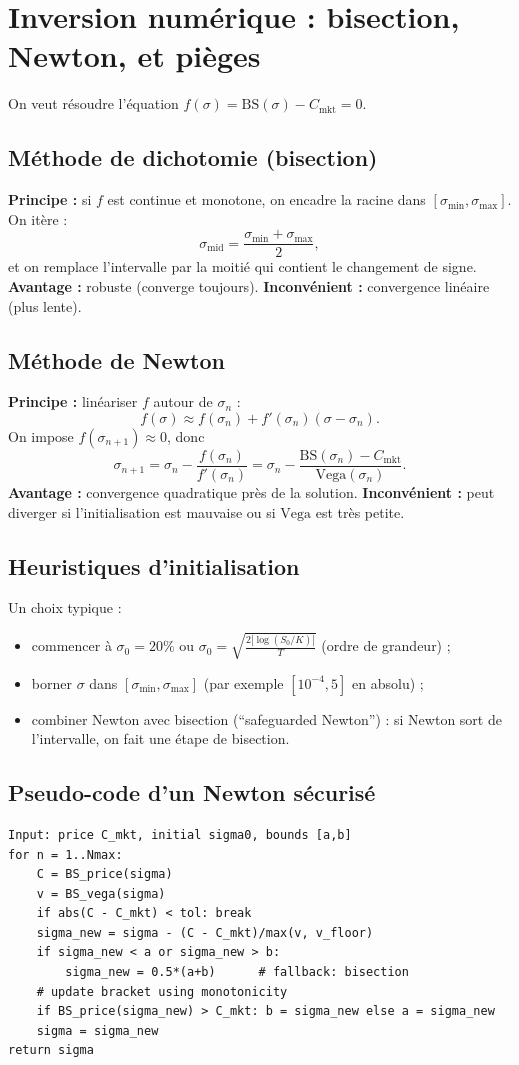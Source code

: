 \documentclass[11pt,a4paper]{report}
\newcommand{\1}{\mathbbm{1}}
\newcommand{\abs}[1]{\left|#1\right|}
\newcommand{\BS}{\mathrm{BS}}
\newcommand{\vega}{\mathrm{Vega}}
\theoremstyle{definition}
\theoremstyle{plain}
\theoremstyle{remark}
\begin{document}
\section{Inversion numérique : bisection, Newton, et pièges}
On veut résoudre l'équation $f(\sigma)=\BS(\sigma)-C_{\mathrm{mkt}}=0$.

\subsection{Méthode de dichotomie (bisection)}
\textbf{Principe :} si $f$ est continue et monotone, on encadre la racine dans $[\sigma_{\min},\sigma_{\max}]$.
On itère :
\[
\sigma_{\mathrm{mid}}=\frac{\sigma_{\min}+\sigma_{\max}}{2},
\]
et on remplace l'intervalle par la moitié qui contient le changement de signe.
\textbf{Avantage :} robuste (converge toujours).
\textbf{Inconvénient :} convergence linéaire (plus lente).

\subsection{Méthode de Newton}
\textbf{Principe :} linéariser $f$ autour de $\sigma_n$ :
\[
f(\sigma)\approx f(\sigma_n)+f'(\sigma_n)(\sigma-\sigma_n).
\]
On impose $f(\sigma_{n+1})\approx 0$, donc
\[
\boxed{
\sigma_{n+1} = \sigma_n - \frac{f(\sigma_n)}{f'(\sigma_n)}
= \sigma_n - \frac{\BS(\sigma_n)-C_{\mathrm{mkt}}}{\vega(\sigma_n)}.
}
\]
\textbf{Avantage :} convergence quadratique près de la solution.
\textbf{Inconvénient :} peut diverger si l'initialisation est mauvaise ou si $\vega$ est très petite.

\subsection{Heuristiques d'initialisation}
Un choix typique :
\begin{itemize}
  \item commencer à $\sigma_0=20\%$ ou $\sigma_0=\sqrt{\frac{2\abs{\log(S_0/K)}}{T}}$ (ordre de grandeur) ;
  \item borner $\sigma$ dans $[\sigma_{\min},\sigma_{\max}]$ (par exemple $[10^{-4},5]$ en absolu) ;
  \item combiner Newton avec bisection (``safeguarded Newton'') : si Newton sort de l'intervalle, on fait une étape de bisection.
\end{itemize}

\subsection{Pseudo-code d'un Newton sécurisé}
\begin{lstlisting}[caption={Newton sécurisé pour volatilité implicite (pseudo-code).},label={lst:newton_iv}]
Input: price C_mkt, initial sigma0, bounds [a,b]
for n = 1..Nmax:
    C = BS_price(sigma)
    v = BS_vega(sigma)
    if abs(C - C_mkt) < tol: break
    sigma_new = sigma - (C - C_mkt)/max(v, v_floor)
    if sigma_new < a or sigma_new > b:
        sigma_new = 0.5*(a+b)      # fallback: bisection
    # update bracket using monotonicity
    if BS_price(sigma_new) > C_mkt: b = sigma_new else a = sigma_new
    sigma = sigma_new
return sigma
\end{lstlisting}
\end{document}
